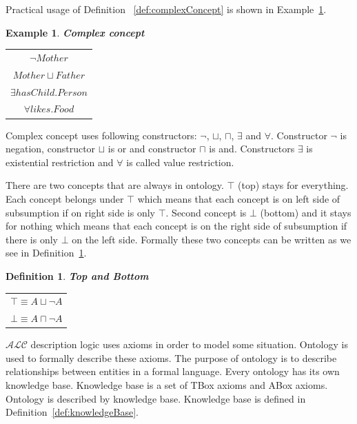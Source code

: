 \documentclass[12pt,a4paper]{article}
\newtheorem{definition}{Definition}[subsection]
\newtheorem{example}{Example}[subsection]
\begin{document}
Practical usage of Definition ~\ref{def:complexConcept} is shown in Example~\ref{example:complexConcept}.

\begin{example}{\textbf{Complex concept}}
	\label{example:complexConcept}
	
	\begin{table}[H]
		\centering
		\begin{tabular}{c}
			$ \neg Mother $ \\
			\addlinespace[0.4cm]
			$ Mother \sqcup Father $ \\
			\addlinespace[0.4cm]			
			$ \exists hasChild.Person $ \\
			\addlinespace[0.4cm]			
			$ \forall likes.Food $ \\
		\end{tabular}
	\end{table}
\end{example}

Complex concept uses following constructors: $\neg$, $\sqcup$, $\sqcap$, $\exists$ and $\forall$. Constructor $\neg$ is negation, constructor $\sqcup$ is or and constructor $\sqcap$ is and. Constructors $\exists$ is existential restriction and $\forall$ is called value restriction.

There are two concepts that are always in ontology. $\top$ (top) stays for everything. Each concept belongs under $\top$ which means that each concept is on left side of subsumption if on right side is only $\top$. Second concept is $\bot$ (bottom) and it stays for nothing which means that each concept is on the right side of subsumption if there is only $\bot$ on the left side. Formally these two concepts can be written as we see in Definition~\ref{def:topBottom}.

\begin{definition}{\textbf{Top and Bottom}}
	\label{def:topBottom}
	
	\begin{table}[H]
		\centering
		\begin{tabular}{c}
			$ \top \equiv A \sqcup \neg A $ \\
			\addlinespace[0.4cm]
			$ \bot \equiv A \sqcap \neg A $
		\end{tabular}
	\end{table}
\end{definition}

$\mathcal{ALC}$ description logic uses axioms in order to model some situation. Ontology \citep{staabHandbookOntology} is used to formally describe these axioms. The purpose of ontology is to describe relationships between entities in a formal language. Every ontology has its own knowledge base. Knowledge base is a set of TBox axioms and ABox axioms. Ontology is described by knowledge base. Knowledge base is defined in Definition~\ref{def:knowledgeBase}.
\end{document}
